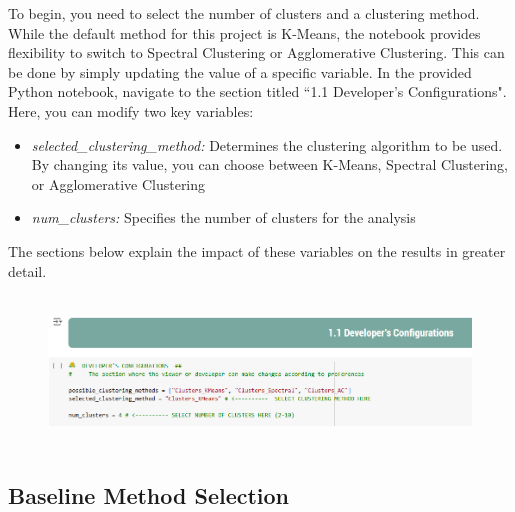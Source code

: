 \documentclass[11pt]{article}
\begin{document}
To begin, you need to select the number of clusters and a clustering method. While the default method for this project is K-Means, the notebook provides flexibility to switch to Spectral Clustering or Agglomerative Clustering. This can be done by simply updating the value of a specific variable. In the provided Python notebook, navigate to the section titled ``1.1 Developer’s Configurations". Here, you can modify two key variables:

\begin{itemize}
	\item \textit{selected\_clustering\_method:} Determines the clustering algorithm to be used. By changing its value, you can choose between K-Means, Spectral Clustering, or Agglomerative Clustering

	\item \textit{num\_clusters:} Specifies the number of clusters for the analysis

\end{itemize}
\vspace{1\baselineskip}
The sections below explain the impact of these variables on the results in greater detail.

\begin{figure}[H]
\centering
\includegraphics[width=15.49cm,height=4.01cm]{./images/image7.png}
\end{figure}


\vspace{1\baselineskip}
\subsection{Baseline Method Selection}
\end{document}
